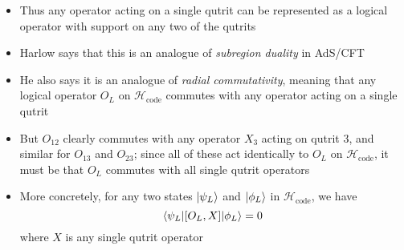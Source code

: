 \documentclass[12pt,a4paper]{article}
\numberwithin{equation}{section}
\begin{document}
\begin{itemize}
		\item Thus any operator acting on a single qutrit can be represented as a logical operator with support on any two of the qutrits
		\item Harlow says that this is an analogue of \textit{subregion duality} in AdS/CFT
		\item He also says it is an analogue of \textit{radial commutativity}, meaning that any logical operator $O_{L}$ on $\mathcal{H}_{\text{code}}$ commutes with any operator acting on a single qutrit
		\item But $O_{12}$ clearly commutes with any operator $X_{3}$ acting on qutrit 3, and similar for $O_{13}$ and $O_{23}$; since all of these act identically to $O_{L}$ on $\mathcal{H}_{\text{code}}$, it must be that $O_{L}$ commutes with all single qutrit operators
		\item More concretely, for any two states $\ket{\psi_{L}}$ and $\ket{\phi_{L}}$ in $\mathcal{H}_{\text{code}}$, we have
		\begin{equation}
			\braket{\psi_{L}|[O_{L},X]|\phi_{L}}=0
		\end{equation}
		where $X$ is any single qutrit operator
	\end{itemize}
\end{document}
